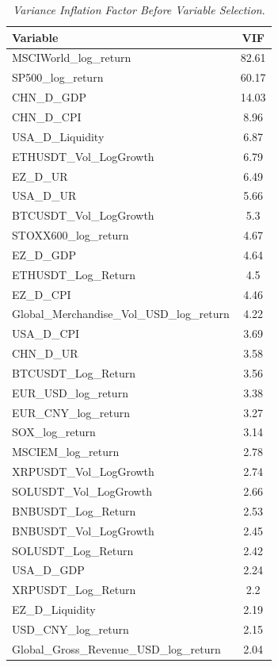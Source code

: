 \begin{table}[h]
  \centering
  \caption{\textit{Variance Inflation Factor Before Variable Selection}.}
  \label{tab:vif_before}
  \begin{tabular}{lc}
    \toprule
    \textbf{Variable} & \textbf{VIF} \\ 
    \midrule
    MSCIWorld\_log\_return & 82.61 \\ 
    SP500\_log\_return & 60.17 \\ 
    CHN\_D\_GDP & 14.03 \\ 
    CHN\_D\_CPI & 8.96 \\ 
    USA\_D\_Liquidity & 6.87 \\ 
    ETHUSDT\_Vol\_LogGrowth & 6.79 \\ 
    EZ\_D\_UR & 6.49 \\ 
    USA\_D\_UR & 5.66 \\ 
    BTCUSDT\_Vol\_LogGrowth & 5.3 \\ 
    STOXX600\_log\_return & 4.67 \\ 
    EZ\_D\_GDP & 4.64 \\ 
    ETHUSDT\_Log\_Return & 4.5 \\ 
    EZ\_D\_CPI & 4.46 \\ 
    Global\_Merchandise\_Vol\_USD\_log\_return & 4.22 \\ 
    USA\_D\_CPI & 3.69 \\ 
    CHN\_D\_UR & 3.58 \\ 
    BTCUSDT\_Log\_Return & 3.56 \\ 
    EUR\_USD\_log\_return & 3.38 \\ 
    EUR\_CNY\_log\_return & 3.27 \\ 
    SOX\_log\_return & 3.14 \\ 
    MSCIEM\_log\_return & 2.78 \\ 
    XRPUSDT\_Vol\_LogGrowth & 2.74 \\ 
    SOLUSDT\_Vol\_LogGrowth & 2.66 \\ 
    BNBUSDT\_Log\_Return & 2.53 \\ 
    BNBUSDT\_Vol\_LogGrowth & 2.45 \\ 
    SOLUSDT\_Log\_Return & 2.42 \\ 
    USA\_D\_GDP & 2.24 \\ 
    XRPUSDT\_Log\_Return & 2.2 \\ 
    EZ\_D\_Liquidity & 2.19 \\ 
    USD\_CNY\_log\_return & 2.15 \\ 
    Global\_Gross\_Revenue\_USD\_log\_return & 2.04 \\ 

\end{tabular}
\end{table}
